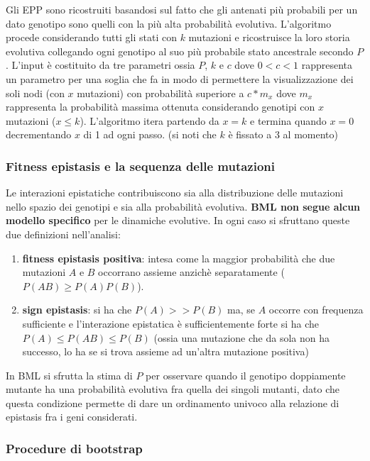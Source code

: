 \documentclass[a4paper]{article}
\begin{document}
	Gli EPP sono ricostruiti basandosi sul fatto che gli antenati più probabili per un dato genotipo sono quelli con la più alta probabilità evolutiva.
	L'algoritmo procede considerando tutti gli stati con $k$ mutazioni e ricostruisce la loro storia evolutiva collegando ogni genotipo al suo più probabile stato ancestrale secondo $P$.
	L'input è costituito da tre parametri ossia $P$, $k$ e $c$ dove $0<c<1$ rappresenta un parametro per una soglia che fa in modo di permettere la visualizzazione dei soli nodi
	(con $x$ mutazioni) con probabilità superiore a $c*m_{x}$ dove $m_x$ rappresenta la probabilità massima ottenuta considerando genotipi con $x$ mutazioni ($x\le k$).  
	L'algoritmo itera partendo da $x=k$ e termina quando $x=0$ decrementando $x$ di 1 ad ogni passo.
	(si noti che $k$ è fissato a 3 al momento)

	\subsubsection{Fitness epistasis e la sequenza delle mutazioni}  

	Le interazioni epistatiche contribuiscono sia alla distribuzione delle mutazioni nello spazio dei genotipi e sia alla probabilità evolutiva. \textbf{BML non segue alcun modello specifico} per le dinamiche evolutive. In ogni caso si sfruttano queste due definizioni nell'analisi:
	\begin{enumerate}	
	\item \textbf{fitness epistasis positiva}: intesa come la maggior probabilità che due mutazioni $A$ e $B$ occorrano assieme anzichè separatamente ($P(AB) \ge P(A)P(B)$).
	\item \textbf{sign epistasis}: si ha che $P(A)>>P(B)$ ma, se $A$ occorre con frequenza sufficiente e l'interazione epistatica è sufficientemente forte si ha che $P(A)\le P(AB) \le P(B)$
	(ossia una mutazione che da sola non ha successo, lo ha se si trova assieme ad un'altra mutazione positiva)
	\end{enumerate}

	In BML si sfrutta la stima di $P$ per osservare quando il genotipo doppiamente mutante ha una probabilità evolutiva fra quella dei singoli mutanti,
	dato che questa condizione permette di dare un ordinamento univoco alla relazione di epistasis fra i geni considerati.

	\subsubsection{Procedure di bootstrap}  
\end{document}
